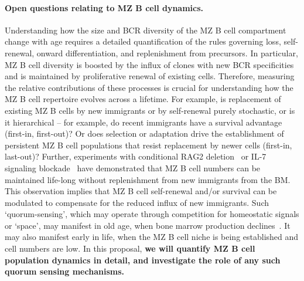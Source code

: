 \documentclass[11pt]{article}
\newcommand{\para}[1]{\vspace*{-4.5mm}\paragraph{#1}}
\begin{document}

\para{Open questions relating to MZ B cell dynamics.}
Understanding how the size and BCR diversity of the MZ B cell compartment change with age requires a detailed quantification of the rules governing loss, self-renewal, onward differentiation, and replenishment from precursors. 
In particular, MZ B cell diversity is boosted by the influx of clones with new BCR specificities and is maintained by proliferative renewal of existing cells.
Therefore, measuring the relative contributions of these processes is crucial for understanding how the MZ B cell repertoire evolves across a lifetime. 
For example, is replacement of existing MZ B cells by new immigrants or by self-renewal purely stochastic, or is it hierarchical -- for example, do recent immigrants have a survival advantage (first-in, first-out)?
Or does selection or adaptation drive the establishment of persistent MZ B cell populations that resist replacement by newer cells (first-in, last-out)?
Further, experiments with conditional RAG2 deletion~\cite{Hao_2001} or IL-7 signaling blockade~\cite{Carvalho_2001} have demonstrated that MZ B cell numbers can be maintained life-long without replenishment from new immigrants from the BM.
This observation implies that MZ B cell self-renewal and/or survival can be modulated to compensate for the reduced influx of new immigrants.
Such `quorum-sensing', which may operate through competition for homeostatic signals or `space', may manifest in old age, when bone marrow production declines~\cite{Kline_1999, Keren_2011, Scholz_2013}.
It may also manifest early in life, when the MZ B cell niche is being established and cell numbers are low.
In this proposal, \textbf{we will quantify MZ B cell population dynamics in detail, and investigate the role of any such quorum sensing mechanisms.}
\end{document}
